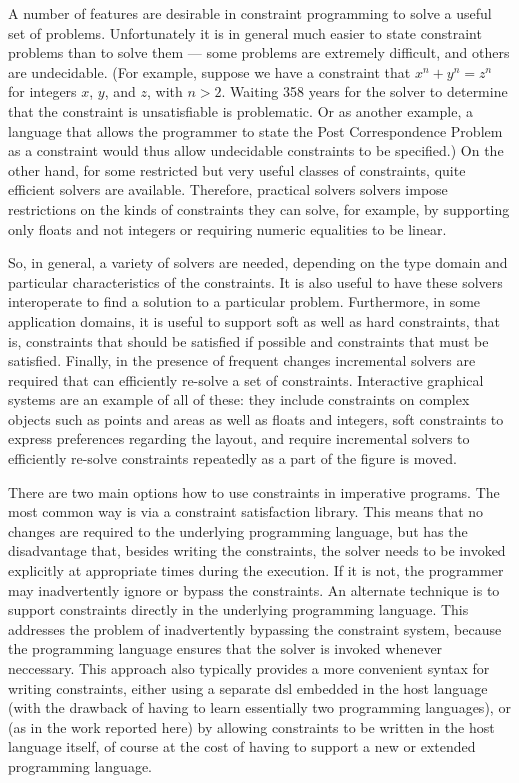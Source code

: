 A number of features are desirable in constraint programming to solve
a useful set of problems.  Unfortunately it is in general much easier
to state constraint problems than to solve them --- some problems are
extremely difficult, and others are undecidable.  (For example,
suppose we have a constraint that $x^n+y^n=z^n$ for integers $x$, $y$,
and $z$, with $n>2$.  Waiting 358 years for the solver to determine
that the constraint is unsatisfiable is problematic.  Or as another
example, a language that allows the programmer to state 
the Post Correspondence Problem as a constraint
would thus allow undecidable constraints to
be specified.)  On the other hand, for some restricted but
very useful classes of constraints, quite efficient solvers are
available.  Therefore, practical solvers solvers impose restrictions
on the kinds of constraints they can solve, for example, by supporting
only floats and not integers or requiring numeric equalities to be
linear.

So, in general, a variety of solvers are
needed, depending on the type domain and particular characteristics of
the constraints.  It is also useful to have these solvers interoperate
to find a solution to a particular problem. Furthermore, in some
application domains, it is useful to support soft as well as hard
constraints, that is, constraints that should be satisfied if possible
and constraints that must be satisfied. Finally, in the presence of
frequent changes incremental solvers are required that can efficiently
re-solve a set of constraints.  Interactive graphical systems are an
example of all of these: they include constraints on complex objects
such as points and areas as well as floats and integers, soft
constraints to express preferences regarding the layout, and require
incremental solvers to efficiently re-solve constraints repeatedly as
a part of the figure is moved.

There are two main options how to use constraints in imperative
programs. The most common way is via a constraint satisfaction
library.  This means that no changes are required to the underlying
programming language, but has the disadvantage that, besides writing
the constraints, the solver needs to be invoked explicitly at
appropriate times during the execution. If it is not, the programmer
may inadvertently ignore or bypass the constraints.  An alternate
technique is to support constraints directly in the underlying
programming language.  This addresses the problem of inadvertently
bypassing the constraint system, because the programming language
ensures that the solver is invoked whenever neccessary. This approach
also typically provides a more convenient syntax for writing
constraints, either using a separate \ac{dsl} embedded in the host
language (with the drawback of having to learn essentially two
programming languages), or (as in the work reported here) by allowing
constraints to be written in the host language itself, of course at
the cost of having to support a new or extended programming
language.

